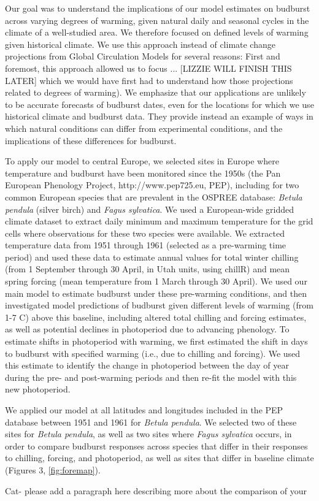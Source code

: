 \documentclass{article}
\begin{document}
\par Our goal was to understand the implications of our model estimates on budburst across varying degrees of warming, given natural daily and seasonal cycles in the climate of a well-studied area. We therefore focused on defined levels of warming given historical climate. We use this approach instead of climate change projections from Global Circulation Models for several reasons: First and foremost, this approach allowed us to focus ... [LIZZIE WILL FINISH THIS LATER] which we would have first had to understand how those projections related to degrees of warming). We emphasize that our applications are unlikely to be accurate forecasts of budburst dates, even for the locations for which we use historical climate and budburst data. They provide instead an example of ways in which natural conditions can differ from experimental conditions, and the implications of these differences for budburst. 

\par To apply our model to central Europe, we selected sites in Europe where temperature and budburst have been monitored since the 1950s (the Pan European Phenology Project, http://www.pep725.eu, PEP), including for two common European species that are prevalent in the OSPREE database: \emph{Betula pendula} (silver birch) and \emph{Fagus sylvatica}. 
We used a European-wide gridded climate dataset \citep{cornes2018} to extract daily minimum and maximum temperature for the grid cells where observations for these two species were available. We extracted temperature data from 1951 through 1961 (selected as a pre-warming time period) and used these data to estimate annual values for total winter chilling (from 1 September through 30 April, in Utah units, using chillR) and mean spring forcing (mean temperature from 1 March through 30 April). We used our main model to estimate budburst under these pre-warming conditions, and then investigated model predictions of budburst given different levels of warming (from 1-7 \degree C) above this baseline, including altered total chilling  and forcing estimates, as well as potential declines in photoperiod due to advancing phenology. To estimate shifts in photoperiod with warming, we first estimated the shift in days to budburst with specified warming (i.e., due to chilling and forcing). We used this estimate to identify the change in photoperiod between the day of year during the pre- and post-warming periods and then re-fit the model with this new photoperiod. 
\par We applied our model at all latitudes and longitudes included in the PEP database between 1951 and 1961 for \emph{Betula pendula}. We selected two of these sites for \emph{Betula pendula}, as well as two sites where \emph{Fagus sylvatica} occurs, in order to compare budburst responses across species that differ in their responses to chilling, forcing, and photoperiod, as well as sites that differ in baseline climate (Figures 3, \ref{fig:foremap}).
\par Cat- please add a paragraph here describing more about the comparison of your 
\end{document}
